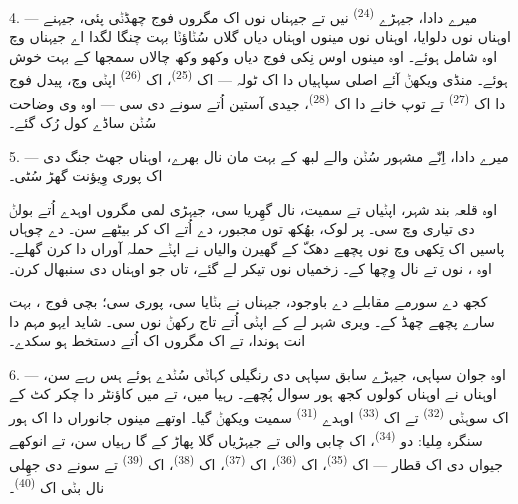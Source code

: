 \VUsaut{4.0mm}
\VUsaut{2.8mm}

4. --- میرے دادا، جیہڑے  \textsuperscript{(24)} نیں تے
جیہناں نوں اک  مگروں فوج چھڈݨی پئی، جیہنے اوہناں نوں
 دلوایا، اوہناں نوں مینوں اوہناں  دیاں گلاں سُݨاؤݨا
بہت چنگا لگدا اے جیہناں وچ اوہ شامل ہوئے۔ اوہ مینوں اوس نِکی فوج دیاں وکھو وکھ
چالاں سمجھا کے بہت خوش ہوئے۔ منڈی ویکھݨ آئے اصلی سپاہیاں دا اک ٹولہ — اک
 \textsuperscript{(25)}، اک 
\textsuperscript{(26)} اپݨی  وچ، پیدل فوج دا اک 
\textsuperscript{(27)} تے توپ خانے دا اک  \textsuperscript{(28)}،
جیدی آستین اُتے سونے دی  سی — اوہ وی وضاحت سُݨن ساڈے کول رُک گئے۔

5. --- میرے دادا، اِنّے مشہور سُݨن والے لبھ کے بہت مان نال بھرے، اوہناں جھٹ جنگ دی
اک پوری وِیؤنت گھڑ سُٹی۔

اوہ قلعہ بند شہر، اپݨیاں  تے  سمیت،
 نال گھِریا سی، جیہڑی لمی  مگروں اوہدے اُتے
 بولݨ دی تیاری وچ سی۔ پر  لوک، بھُکھ توں مجبور،
 دے  اُتے اک  کر بیٹھے سن۔
 دے چوہاں پاسیں اک تِکھی  وچ  نوں پچھے دھکّ
کے  گھیرن والیاں نے اپݨے 
 حملہ آوراں دا  کرن گھلے۔ اوہ ،
 نوں  تے  نال وِچھا کے۔
 زخمیاں نوں  تیکر لے گئے، تاں جو
 اوہناں دی سنبھال کرن۔

کجھ  دے سورمے مقابلے دے باوجود، جیہناں نے 
بݨایا سی،  پوری سی؛ بچی فوج ، بہت سارے 
پچھے چھڈ کے۔ ویری شہر لے کے اپݨی  اُتے تاج رکھݨ نوں سی۔ شاید ایہو مہم دا
انت ہوندا، تے اک  مگروں اک  اُتے دستخط ہو
سکدے۔

\VUsaut{4.4mm}
\VUsaut{2.8mm}

6. --- اوہ جوان سپاہی، جیہڑے سابق سپاہی دی رنگیلی کہاݨی سُݨدے ہوئے ہس رہے سن،
اوہناں نے اوہناں کولوں کجھ ہور سوال پُچھے۔ رہیا میں، تے میں کاؤنٹر دا چکر کٹ کے اک
سوہݨی  \textsuperscript{(32)} تے اک  \textsuperscript{(33)}
اوہدے  \textsuperscript{(31)} سمیت ویکھݨ گیا۔ اوتھے مینوں جانوراں دا اک
ہور سنگرہ مِلیا: دو  \textsuperscript{(34)}، اک چابی والی
 تے  جیہڑیاں گلا پھاڑ کے گا رہیاں سن، تے انوکھے جیواں دی
اک قطار — اک  \textsuperscript{(35)}، اک 
\textsuperscript{(36)}، اک  \textsuperscript{(37)}، اک 
\textsuperscript{(38)}، اک  \textsuperscript{(39)} تے سونے دی جھِلی نال
بݨی اک  \textsuperscript{(40)}۔

